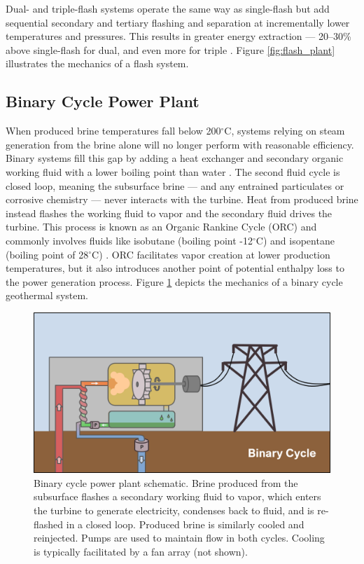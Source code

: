 Dual- and triple-flash systems operate the same way as single-flash but add sequential secondary and tertiary flashing and separation at incrementally lower temperatures and pressures. This results in greater energy extraction --- 20--30\% above single-flash for dual, and even more for triple \citep[p.\ 216]{glassley_geothermal_2015}. Figure \ref{fig:flash_plant} illustrates the mechanics of a flash system.

\subsection{Binary Cycle Power Plant}\label{ch2:binary_plant}
When produced brine temperatures fall below 200$^\circ$C, systems relying on steam generation from the brine alone will no longer perform with reasonable efficiency. Binary systems fill this gap by adding a heat exchanger and secondary organic working fluid with a lower boiling point than water \citep{moore_more_2013}. The second fluid cycle is closed loop, meaning the subsurface brine --- and any entrained particulates or corrosive chemistry --- never interacts with the turbine. Heat from produced brine instead flashes the working fluid to vapor and the secondary fluid drives the turbine. This process is known as an Organic Rankine Cycle (ORC) and commonly involves fluids like isobutane (boiling point -12$^\circ$C) and isopentane (boiling point of 28$^\circ$C) \citep[p.\ 219]{glassley_geothermal_2015}. ORC facilitates vapor creation at lower production temperatures, but it also introduces another point of potential enthalpy loss to the power generation process. Figure \ref{fig:binary_plant} depicts the mechanics of a binary cycle geothermal system.

\begin{figure}%
\centering
\includegraphics[width=.9\textwidth]{templates/images/Figure-BinaryPlant_Schematic.png}
\caption[Binary cycle power plant schematic]{Binary cycle power plant schematic. Brine produced from the subsurface flashes a secondary working fluid to vapor, which enters the turbine to generate electricity, condenses back to fluid, and is re-flashed in a closed loop. Produced brine is similarly cooled and reinjected. Pumps are used to maintain flow in both cycles. Cooling is typically facilitated by a fan array (not shown).}
\label{fig:binary_plant}
\end{figure}

